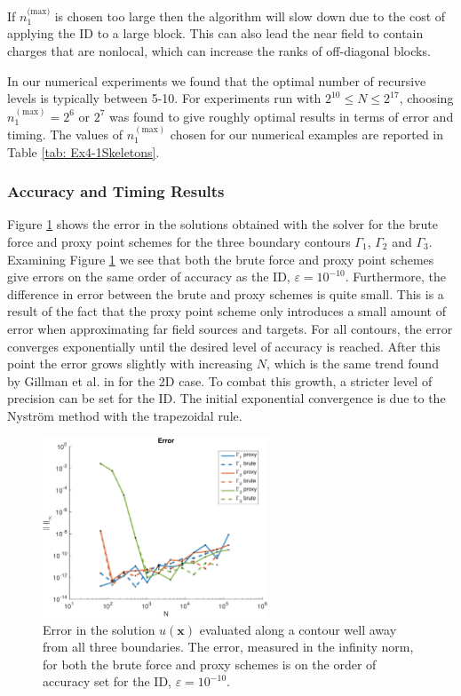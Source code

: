 \documentclass{sfuthesis}
\begin{document}
If $n_1^{\text{(max)}}$ is chosen too large then the algorithm will slow down due to the cost of applying the ID to a large block. This can also lead the near field to contain charges that are nonlocal, which can increase the ranks of off-diagonal blocks. 

In our numerical experiments we found that the optimal number of recursive levels is typically between 5-10. For experiments run with $2^{10} \leq N \leq 2^{17}$, choosing $n_1^{(\text{max})}=2^6$ or $2^7$ was found to give roughly optimal results in terms of error and timing. The values of $n_1^{(\text{max})}$ chosen for our numerical examples are reported in Table \ref{tab: Ex4-1Skeletons}. 
  
\subsubsection{Accuracy and Timing Results}
Figure \ref{fig: Ex4-1Error} shows the error in the solutions obtained with the solver for the brute force and proxy point schemes for the three boundary contours $\Gamma_1$, $\Gamma_2$ and $\Gamma_3$. Examining Figure \ref{fig: Ex4-1Error} we see that both the brute force and proxy point schemes give errors on the same order of accuracy as the ID, $\varepsilon=10^{-10}$. Furthermore, the difference in error between the brute and proxy schemes is quite small. This is a result of the fact that the proxy point scheme only introduces a small amount of error when approximating far field sources and targets. For all contours, the error converges exponentially until the desired level of accuracy is reached. After this point the error grows slightly with increasing $N$, which is the same trend found by Gillman et al. in \cite{GillYoungMart2012} for the 2D case.  To combat this growth, a stricter level of precision can be set for the ID. The initial exponential convergence is due to the Nystr\"{o}m method with the trapezoidal rule.
\begin{figure}[h]
	\centering
        \includegraphics[width=0.6\textwidth]{Ex4-1Error}
        \caption{Error in the solution $u(\mathbf{x})$ evaluated along a contour well away from all three boundaries. The error, measured in the infinity norm,  for both the brute force and proxy schemes is on the order of accuracy set for the ID, $\varepsilon=10^{-10}$.}
        \label{fig: Ex4-1Error}
\end{figure}
\end{document}
